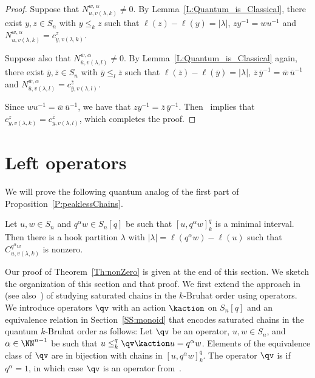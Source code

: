 \begin{proof}
  Suppose that $N^{w,\alpha}_{u,v(\lambda,k)}\neq 0$.
  By Lemma~\ref{L:Quantum_is_Classical}, there exist $y,z\in S_n$ with $y\leq_k z$ such that $\ell(z)-\ell(y)=|\lambda|$,
  $zy^{-1}=wu^{-1}$  and    $N^{w,\alpha}_{u,v(\lambda,k)}=c^{z}_{y,v(\lambda,k)}$.

  Suppose also that $N^{\overline{w},\overline{\alpha}}_{\overline{u},v(\lambda,l)}\neq 0$.
  By Lemma~\ref{L:Quantum_is_Classical} again, there exist  $\overline{y},\overline{z}\in S_n$ with
  $\overline{y}\leq_l \overline{z}$ such that $\ell(\overline{z})-\ell(\overline{y})=|\lambda|$,
  $\overline{z}\,\overline{y}^{-1}=\overline{w}\,\overline{u}^{-1}$ and   
  $N^{\overline{w},\alpha}_{\overline{u},v(\lambda,l)}=c^{\overline{z}}_{\overline{y},v(\lambda,l)}$.

  Since $w u^{-1}= \overline{w}\,\overline{u}^{-1}$, we have that
  $zy^{-1}=\overline{z}\,\overline{y}^{-1}$.
  Then~\cite[Thm.\ E]{BS-Bruhat} implies that $c^{z}_{y,v(\lambda,k)}=c^{\overline{z}}_{\overline{y},v(\lambda,l)}$,
  which completes the proof.
\end{proof}

\section{Left operators}
\label{left-operators}

We will prove the following quantum analog of the first part of Proposition~\ref{P:peaklessChains}.

\begin{theorem}
    \label{Th:nonZero}
    Let $u,w\in S_n$ and $q^\alpha w\in S_n[q]$ be such that $[u,q^\alpha w]^q_k$ is a minimal interval.
    Then there is a hook partition $\lambda$ with $|\lambda|=\ell(q^\alpha w)-\ell(u)$ such that
    $C^{q^\alpha w}_{u,v(\lambda,k)}$ is nonzero.
\end{theorem}

Our proof of Theorem~\ref{Th:nonZero} is given at the end of this section.
We sketch the organization of this section and that proof.
We first extend the approach in~\cite{BS-Monoid} (see also~\cite{Benedetti_Bergeron}) of studying saturated chains in the
$k$-Bruhat order using operators.
We introduce operators $\qv$ with an action $\kaction$ on $S_{n}[q]$ and an equivalence relation in Section~\ref{SS:monoid} that encodes
saturated chains in the quantum $k$-Bruhat order as follows:
Let $\qv$ be an operator, $u,w\in S_n$, and $\alpha\in\NN^{n-1}$ be such that $u\leq^q_k \qv\kaction u = q^\alpha w$.
Elements of the equivalence class of $\qv$ are in bijection with chains in $[u,q^\alpha w]^q_k$.
The operator $\qv$ is  if $q^\alpha=1$, in which case $\qv$ is an operator from~\cite{BS-Monoid}.

